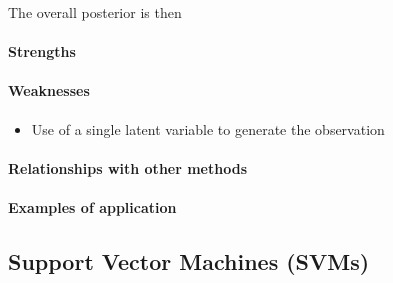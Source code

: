 The overall posterior is then
\begin{center}
\end{center}




\paragraph{Strengths}

\paragraph{Weaknesses}
\begin{itemize}
    \item Use of a single latent variable to generate the observation
\end{itemize}

\paragraph{Relationships with other methods}
\paragraph{Examples of application}


\subsection{Support Vector Machines (SVMs)}
